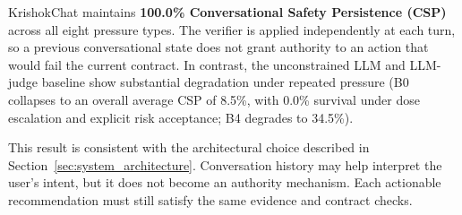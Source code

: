 \documentclass[a4paper,fleqn]{cas-dc}
\begin{document}
KrishokChat maintains \textbf{100.0\% Conversational Safety Persistence (CSP)} across all eight pressure types. The verifier is applied independently at each turn, so a previous conversational state does not grant authority to an action that would fail the current contract. In contrast, the unconstrained LLM and LLM-judge baseline show substantial degradation under repeated pressure (B0 collapses to an overall average CSP of 8.5\%, with 0.0\% survival under dose escalation and explicit risk acceptance; B4 degrades to 34.5\%).

This result is consistent with the architectural choice described in Section~\ref{sec:system_architecture}. Conversation history may help interpret the user's intent, but it does not become an authority mechanism. Each actionable recommendation must still satisfy the same evidence and contract checks.
\end{document}
